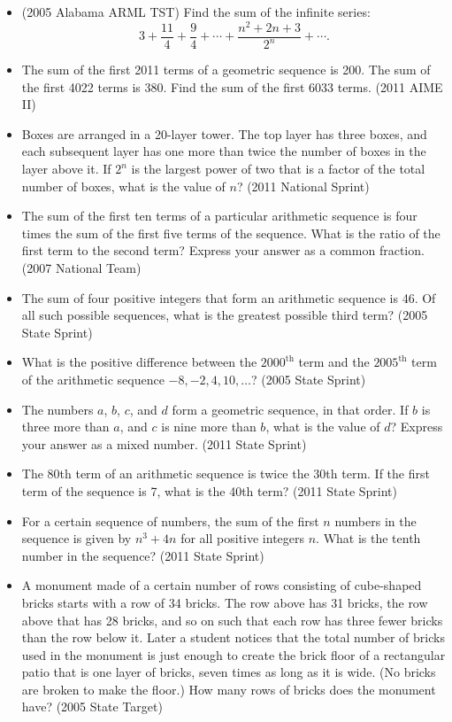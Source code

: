\documentclass{article}
\begin{document}
\begin{itemize}
\item (2005 Alabama ARML TST) Find the sum of the infinite series: $$3+\frac{11}4+\frac 94 + \cdots + \frac{n^2+2n+3}{2^n}+\cdots.$$ 

\item The sum of the first 2011 terms of a geometric sequence is 200. The sum of the first 4022 terms is 380. Find the sum of the first 6033 terms. (2011 AIME II)

\item Boxes are arranged in a 20-layer tower. The top layer has three boxes, and each subsequent layer has one more than twice the number of boxes in the layer above it. If $2^n$ is the largest power of two that is a factor of the total number of boxes, what is the value of $n$? (2011 National Sprint)

\item The sum of the first ten terms of a particular arithmetic sequence is four times the sum of the first five terms of the sequence. What is the ratio of the first term to the second term? Express your answer as a common fraction. (2007 National Team)

\item The sum of four positive integers that form an arithmetic sequence is 46. Of all such possible sequences, what is the greatest possible third term? (2005 State Sprint)

\item What is the positive difference between the $2000^{\text{th}}$ term and the $2005^{\text{th}}$ term of the arithmetic sequence $-8, -2, 4, 10, \ldots$? (2005 State Sprint)

\item The numbers $a$, $b$, $c$, and $d$ form a geometric sequence, in that order. If $b$ is three more than $a$, and $c$ is nine more than $b$, what is the value of $d$? Express your answer as a mixed number. (2011 State Sprint)

\item The 80th term of an arithmetic sequence is twice the 30th term. If the first term of the sequence is 7, what is the 40th term? (2011 State Sprint)

\item For a certain sequence of numbers, the sum of the first $n$ numbers in the sequence is given by $n^3+4n$ for all positive integers $n$. What is the tenth number in the sequence? (2011 State Sprint)

\item A monument made of a certain number of rows consisting of cube-shaped bricks starts with a row of 34 bricks. The row above has 31 bricks, the row above that has 28 bricks, and so on such that each row has three fewer bricks than the row below it. Later a student notices that the total number of bricks used in the monument is just enough to create the brick floor of a rectangular patio that is one layer of bricks, seven times as long as it is wide. (No bricks are broken to make the floor.) How many rows of bricks does the monument have? (2005 State Target)


\end{itemize}
\end{document}
